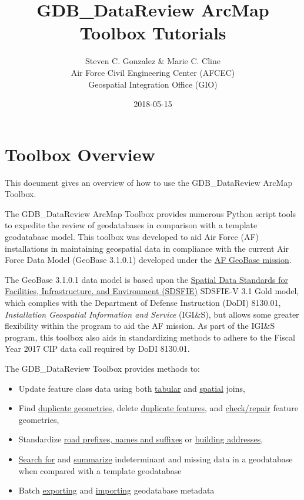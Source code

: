 \documentclass[openany]{book}
\title{GDB\_DataReview ArcMap Toolbox Tutorials}
\author{Steven C. Gonzalez \& Marie C. Cline \\ Air Force Civil Engineering Center (AFCEC) \\ Geospatial Integration Office (GIO)}
\date{2018-05-15}
\providecommand{\tightlist}{%
  \setlength{\itemsep}{0pt}\setlength{\parskip}{0pt}}
\theoremstyle{definition}
\theoremstyle{definition}
\theoremstyle{definition}
\theoremstyle{remark}
\begin{document}
\maketitle

{
\setcounter{tocdepth}{0}
\tableofcontents
}
\chapter{Toolbox Overview}\label{overview}

This document gives an overview of how to use the GDB\_DataReview ArcMap
Toolbox.

The GDB\_DataReview ArcMap Toolbox provides numerous Python script tools
to expedite the review of geodatabases in comparison with a template
geodatabase model. This toolbox was developed to aid Air Force (AF)
installations in maintaining geospatial data in compliance with the
current Air Force Data Model (GeoBase 3.1.0.1) developed under the
\href{https://www.sdsfieonline.org/Components/USAF}{AF GeoBase mission}.

The GeoBase 3.1.0.1 data model is based upon the
\href{https://www.sdsfieonline.org/}{Spatial Data Standards for
Facilities, Infrastructure, and Environment (SDSFIE)} SDSFIE-V 3.1 Gold
model, which complies with the Department of Defense Instruction (DoDI)
8130.01, \emph{Installation Geospatial Information and Service}
(IGI\&S), but allows some greater flexibility within the program to aid
the AF mission. As part of the IGI\&S program, this toolbox also aids in
standardizing methods to adhere to the Fiscal Year 2017 CIP data call
required by DoDI 8130.01.

The GDB\_DataReview Toolbox provides methods to:

\begin{itemize}
\tightlist
\item
  Update feature class data using both
  \protect\hyperlink{joinCalc}{tabular} and
  \protect\hyperlink{spatjoinCalc}{spatial} joins,
\item
  Find \protect\hyperlink{dupGeom}{duplicate geometries}, delete
  \protect\hyperlink{dupFeats}{duplicate features}, and
  \protect\hyperlink{chkGeom}{check/repair} feature geometries,
\item
  Standardize \protect\hyperlink{std3}{road prefixes, names and
  suffixes} or \protect\hyperlink{stdAdd1}{building addresses},
\item
  \protect\hyperlink{indtSearch}{Search for} and
  \protect\hyperlink{summIndt}{summarize} indeterminant and missing data
  in a geodatabase when compared with a template geodatabase
\item
  Batch \protect\hyperlink{exMeta}{exporting} and
  \protect\hyperlink{imMeta}{importing} geodatabase metadata
\end{itemize}
\end{document}
